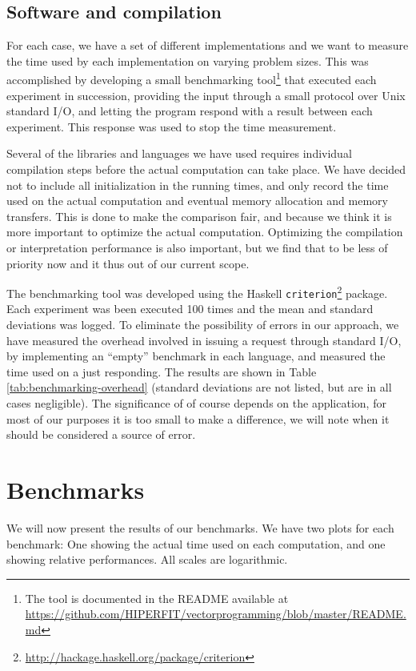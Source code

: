 \subsection{Software and compilation}
For each case, we have a set of different implementations and we want
to measure the time used by each implementation on varying problem
sizes. This was accomplished by developing a small benchmarking
tool\footnote{The tool is documented in the README available at
  \url{https://github.com/HIPERFIT/vectorprogramming/blob/master/README.md}}
that executed each experiment in succession, providing the input
through a small protocol over Unix standard I/O, and letting the
program respond with a result between each experiment. This response
was used to stop the time measurement.

Several of the libraries and languages we have used requires
individual compilation steps before the actual computation can take
place. We have decided not to include all initialization in the
running times, and only record the time used on the actual computation
and eventual memory allocation and memory transfers. This is done to make the
comparison fair, and because we think it is more important to optimize
the actual computation. Optimizing the compilation or interpretation
performance is also important, but we find that to be less of priority
now and it thus out of our current scope.

The benchmarking tool was developed using the Haskell
\texttt{criterion}\footnote{\url{http://hackage.haskell.org/package/criterion}}
package. Each experiment was been executed 100 times and the mean and
standard deviations was logged. To eliminate the possibility of errors
in our approach, we have measured the overhead involved in issuing a
request through standard I/O, by implementing an ``empty'' benchmark
in each language, and measured the time used on a just responding. The
results are shown in Table \ref{tab:benchmarking-overhead} (standard
deviations are not listed, but are in all cases negligible). The
significance of of course depends on the application, for most of our
purposes it is too small to make a difference, we will note when it
should be considered a source of error.

\section{Benchmarks}
We will now present the results of our benchmarks. We have two plots
for each benchmark: One showing the actual time used on each
computation, and one showing relative performances. All scales are
logarithmic.

